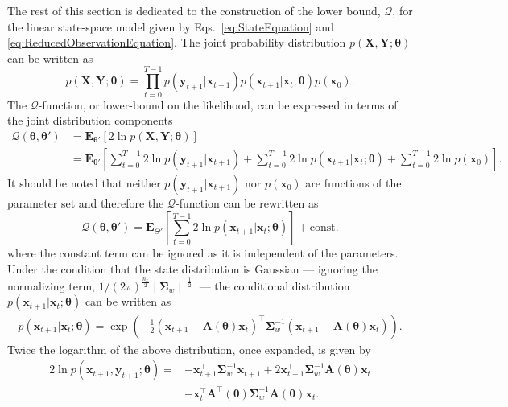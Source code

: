 \documentclass[review,authoryear,3p]{elsarticle}
\begin{document}
 The rest of this section is dedicated to the construction of the lower bound, $\mathcal Q$, for the linear state-space model given by Eqs.~\eqref{eq:StateEquation} and \eqref{eq:ReducedObservationEquation}. The joint probability distribution $p(\mathbf X,\mathbf Y;\boldsymbol \theta)$ can be written as
 \begin{equation}\label{eq:jointdistribution}
  p(\mathbf X,\mathbf Y;\boldsymbol \theta)=\prod_{t=0}^{T-1} p(\mathbf y_{t+1}|\mathbf x_{t+1})p(\mathbf x_{t+1}|\mathbf x_{t};\boldsymbol \theta)p(\mathbf x_0).
 \end{equation}
The $\mathcal Q$-function, or lower-bound on the likelihood, can be expressed in terms of the joint distribution components
 \begin{align}
  \mathcal Q(\boldsymbol \theta,\boldsymbol\theta')&=\mathbf E_{\boldsymbol \theta'}\left[2\ln p(\mathbf X,\mathbf Y;\boldsymbol \theta)\right] \nonumber \\
 &=\mathbf E_{\boldsymbol\theta'}\left[\sum_{t=0}^{T-1}2\ln p(\mathbf y_{t+1}|\mathbf x_{t+1})+\sum_{t=0}^{T-1}2\ln p(\mathbf x_{t+1}|\mathbf x_{t};\boldsymbol \theta)
 +\sum_{t=0}^{T-1}2\ln p(\mathbf x_0)\right].
 \end{align}   
It should be noted that neither $p(\mathbf y_{t+1}|\mathbf x_{t+1})$ nor $p(\mathbf x_0)$ are functions of the parameter set and therefore the $\mathcal Q$-function can be rewritten as
\begin{equation}
\mathcal Q(\boldsymbol \theta,\boldsymbol\theta')=\mathbf E_{\Theta'}\left[\sum_{t=0}^{T-1}2\ln p(\mathbf x_{t+1}|\mathbf x_{t};\boldsymbol \theta)\right]+\mathrm{const.}
\end{equation}
where the constant term can be ignored as it is independent of the parameters. Under the condition that the state distribution is Gaussian --- ignoring the normalizing term, $1/(2\pi)^{\frac{n_x}{2}}\mid\boldsymbol\Sigma_w\mid^{-\frac{1}{2}}$ --- the conditional distribution $p(\mathbf x_{t+1} | \mathbf x_{t};\boldsymbol\theta)$ can be written as
\begin{align}
p(\mathbf x_{t+1} | \mathbf x_{t};\boldsymbol\theta)=  \exp\left({-\frac{1}{2}\left(\mathbf x_{t+1}-\mathbf A\left(\boldsymbol\theta\right)\mathbf  x_t\right)^\top\boldsymbol\Sigma_w^{-1}\left(\mathbf x_{t+1}-\mathbf A\left(\boldsymbol\theta\right)\mathbf  x_t\right)}\right).
\end{align}
Twice the logarithm of the above distribution, once expanded, is given by
\begin{align}\label{eq:Qfunction}
2\ln p(\mathbf x_{t+1} , \mathbf y_{t+1};\boldsymbol\theta)=&-\mathbf x_{t+1}^\top\boldsymbol\Sigma_w^{-1}\mathbf x_{t+1}+2\mathbf x_{t+1}^\top\boldsymbol\Sigma_w^{-1}\mathbf A( \boldsymbol\theta)\mathbf x_t\nonumber \\
&-\mathbf x_t^\top\mathbf A^\top(\boldsymbol\theta)\boldsymbol\Sigma_w^{-1}\mathbf A(\boldsymbol\theta)\mathbf x_t.
\end{align}
\end{document}
